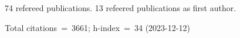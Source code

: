 74 refereed publications. 13 refeered publications as first author.

Total citations~=~3661; h-index~=~34 (2023-12-12)